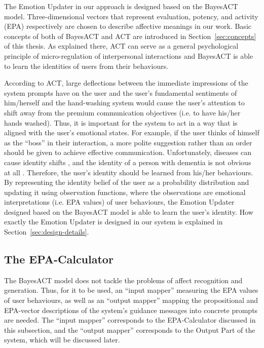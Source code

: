 The Emotion Updater in our approach is designed based on the BayesACT model. Three-dimensional vectors that represent evaluation, potency, and activity (EPA) respectively are chosen to describe affective meanings in our work. Basic concepts of both of BayesACT and ACT are introduced in Section~\ref{sec:concepts} of this thesis. As explained there, ACT can serve as a general psychological principle of micro-regulation of interpersonal interactions and BayesACT is able to learn the identities of users from their behaviours.

According to ACT, large deflections between the immediate impressions of the system prompts have on the user and the user's fundamental sentiments of him/herself and the hand-washing system would cause the user's attention to shift away from the premium communication objectives (i.e. to have his/her hands washed). Thus, it is important for the system to act in a way that is aligned with the user's emotional states. For example, if the user thinks of himself as the ``boss'' in their interaction, a more polite suggestion rather than an order should be given to achieve effective communication. Unfortunately, diseases can cause identity shifts \cite{lively2011identity}, and the identity of a person with dementia is not obvious at all \cite{orona1990temporality, rose2004memory}. Therefore, the user's identity should be learned from his/her behaviours. By representing the identity belief of the user as a probability distribution and updating it using observation functions, where the observations are emotional interpretations (i.e. EPA values) of user behaviours, the Emotion Updater designed based on the BayesACT model is able to learn the user's identity. How exactly the Emotion Updater is designed in our system is explained in Section~\ref{sec:design-details}.

\subsection{The EPA-Calculator}

The BayesACT model does not tackle the problems of affect recognition and generation. Thus, for it to be used, an ``input mapper'' measuring the EPA values of user behaviours, as well as an ``output mapper'' mapping the propositional and EPA-vector descriptions of the system's guidance messages into concrete prompts are needed. The ``input mapper'' corresponds to the EPA-Calculator discussed in this subsection, and the ``output mapper'' corresponds to the Output Part of the system, which will be discussed later.

